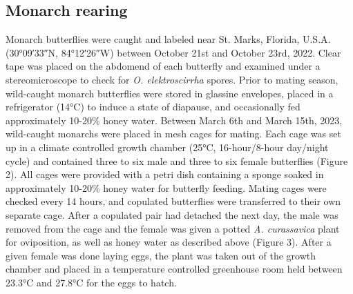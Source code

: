 \documentclass{article}
\begin{document}
\begin{multicols}{2}
    \section{Monarch rearing}
    \indent Monarch butterflies were caught and labeled near St. Marks, Florida, U.S.A. (30°09′33″N, 84°12′26″W) between October 21st and 
    October 23rd, 2022. Clear tape was placed on the abdomend of each butterfly and examined under a stereomicroscope to check for 
    \emph{O. elektroscirrha} spores. Prior to mating season, wild-caught monarch butterflies were stored in glassine envelopes, placed in a 
    refrigerator (14°C) to induce a state of diapause, and occasionally fed approximately 10-20\% honey water. Between March 6th and 
    March 15th, 2023, wild-caught monarchs were placed in mesh cages for mating. Each cage was set up in a climate controlled growth chamber 
    (25°C, 16-hour/8-hour day/night cycle) and contained three to six male and three to six female butterflies (Figure 2). All cages were provided 
    with a petri dish containing a sponge soaked in approximately 10-20\% honey water for butterfly feeding. Mating cages were checked every 14 hours, 
    and copulated butterflies were transferred to their own separate cage. After a copulated pair had detached the next day, the male was removed from 
    the cage and the female was given a potted \emph{A. curassavica} plant for oviposition, as well as honey water as described above (Figure 3). After a 
    given female was done laying eggs, the plant was taken out of the growth chamber and placed in a temperature controlled greenhouse room held between 
    23.3°C and 27.8°C for the eggs to hatch. 


\end{multicols}
\end{document}
